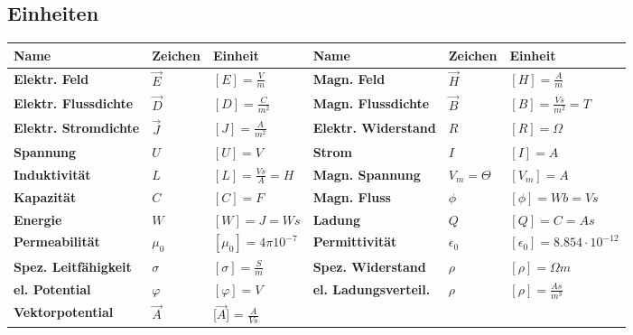 \subsection{Einheiten}
\enlargethispage{\baselineskip}
\renewcommand{\arraystretch}{1.5}
\begin{tabular}{|p{3.5cm}|p{1.5cm}|p{3cm}||p{3.5cm}|p{1.5cm}|p{3.2cm}|}
	\hline
	\textbf{Name}			&\textbf{Zeichen} & \textbf{Einheit}&
	\textbf{Name}			&\textbf{Zeichen} & \textbf{Einheit}\\
	\hline
	\textbf{Elektr. Feld} 	& $\vec{E}$	& $[E] = \frac{V}{m}$&	
	\textbf{Magn. Feld}		& $\vec{H}$ & $[H] = \frac{A}{m}$\\
	\hline
	\textbf{Elektr. Flussdichte}&$\vec{D}$&$[D] = \frac{C}{m^2}$&
	\textbf{Magn. Flussdichte}&$\vec{B}$&$[B] = \frac{Vs}{m^2}=T$\\
	\hline
	\textbf{Elektr. Stromdichte} &$\vec{J}$& $[J]=\frac{A}{m^2}$&
	\textbf{Elektr. Widerstand} &$R$ &$[R]=\Omega$\\
	\hline
	\textbf{Spannung}&$U$&$[U]=V$&
	\textbf{Strom}&$I$&$[I]=A$\\
	\hline
	\textbf{Induktivität}&$L$&$[L]=\frac{Vs}{A}=H$&
	\textbf{Magn. Spannung}&$V_{m}=\Theta$&$[V_{m}]=A$\\
	\hline
	\textbf{Kapazität}&$C$&$[C]=F$&
	\textbf{Magn. Fluss}&$\phi$&$[\phi]=Wb=Vs$\\
	\hline
	\textbf{Energie}&$W$&$[W]=J=Ws$&
	\textbf{Ladung}&$Q$&$[Q]=C=As$\\
	\hline	
	\textbf{Permeabilität}&$\mu_{0} $&$[\mu_{0}]=4\pi 10^{-7}$&
	\textbf{Permittivität}&$\epsilon_{0}$&$[\epsilon_{0}]=8.854\cdot 10^{-12}$\\
	\hline
	\textbf{Spez. Leitfähigkeit}&$\sigma$&$[\sigma]=\frac{S}{m}$&
	\textbf{Spez. Widerstand}&$\rho $&$[\rho]=\Omega m $\\
	\hline
    \textbf{el. Potential}&$\varphi$&$[\varphi]= V$&
    \textbf{el. Ladungsverteil.}&$\rho$&$[\rho]=\frac{As}{m^3}$\\
    \hline
    \textbf{Vektorpotential}&\textbf{$\vec A$}& [\textbf{$\vec A$}] = $\frac{A}{Vs}$&
    & & \\
    \hline
\end{tabular}

\clearpage
\pagebreak